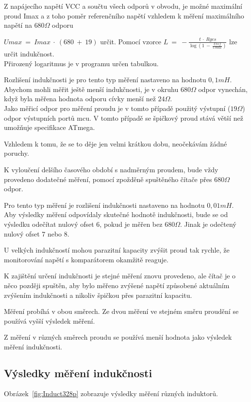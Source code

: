 Z napájecího napětí VCC a součtu všech odporů v obvodu, je možné maximální proud Imax a
z toho poměr referenčního napětí vzhledem k měření maximálního napětí na \(680\Omega\) odporu

\(Umax~=~Imax~\cdot~(680~+~19)\) určit. Pomocí vzorce \(L~=~-\frac{t~\cdot~Rges}{\log{(1~-~\frac{Uref}{Umax})}}\) lze určit indukčnost.\\
Přirozený logaritmus je v programu určen tabulkou.

Rozlišení indukčnosti je pro tento typ měření nastaveno na hodnotu \(0,1mH\).\\
Abychom mohli měřit ještě menší indukčnosti, je v okruhu \(680\Omega\) odpor vynechán,
když byla měřena hodnota odporu cívky menší než \(24\Omega\).\\
Jako měřicí odpor pro měření proudu je v tomto případě použitý výstupní (\(19\Omega\)) odpor výstupních portů mcu. V tomto případě se špičkový proud stává větší než umožňuje specifikace ATmega.

Vzhledem k tomu, že se to děje jen velmi krátkou dobu, neočekávám žádné poruchy.

K vyloučení delšího časového období s nadměrným proudem, bude vždy provedeno dodatečné měření, pomocí
zpožděně spuštěného čítače přes \(680\Omega\) odpor.

Pro tento typ měření je rozlišení indukčnosti nastaveno na hodnotu \(0,01mH\).\\
Aby výsledky měření odpovídaly skutečné hodnotě indukčnosti, bude se od výsledku odečítat nulový ofset 6, pokud je měřen bez \(680\Omega\). Jinak je odečtený nulový ofset 7 nebo 8.

U velkých indukčností mohou parazitní kapacity zvýšit proud tak rychle, že
monitorování napětí s komparátorem okamžitě reaguje.

K zajištění určení indukčnosti je stejné měření znovu provedeno, ale čítač je o něco později spuštěn, aby bylo měřeno zvýšené napětí způsobené aktuálním zvýšením indukčnosti a nikoliv špičkou přes parazitní kapacitu.

Měření probíhá v obou směrech. Ze dvou měření ve stejném směru proudění se používá vyšší výsledek měření.

Z měření v různých směrech proudu se používá menší hodnota jako výsledek měření indukčnosti.

\subsection{Výsledky měření indukčnosti}
Obrázek~\ref{fig:Induct328p} zobrazuje výsledky měření různých induktorů.

